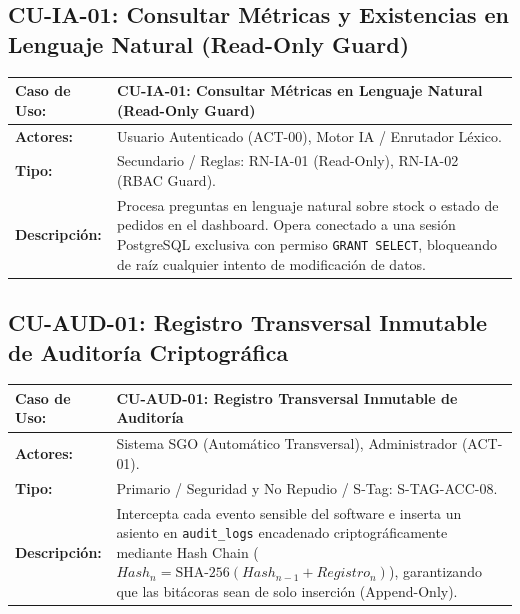\documentclass[12pt,a4paper]{report}
\begin{document}
\subsection{CU-IA-01: Consultar Métricas y Existencias en Lenguaje Natural (Read-Only Guard)}
\begin{table}[H]
\centering
\small
\begin{tabularx}{\textwidth}{|L{3.5cm}|X|}
\hline
{}\color{white}\textbf{Caso de Uso:} & \textbf{CU-IA-01: Consultar Métricas en Lenguaje Natural (Read-Only Guard)} \\
\hline
\textbf{Actores:} & Usuario Autenticado (ACT-00), Motor IA / Enrutador Léxico. \\
\hline
\textbf{Tipo:} & Secundario / Reglas: RN-IA-01 (Read-Only), RN-IA-02 (RBAC Guard). \\
\hline
\textbf{Descripción:} & Procesa preguntas en lenguaje natural sobre stock o estado de pedidos en el dashboard. Opera conectado a una sesión PostgreSQL exclusiva con permiso \texttt{GRANT SELECT}, bloqueando de raíz cualquier intento de modificación de datos. \\
\hline
\end{tabularx}
\end{table}

\subsection{CU-AUD-01: Registro Transversal Inmutable de Auditoría Criptográfica}
\begin{table}[H]
\centering
\small
\begin{tabularx}{\textwidth}{|L{3.5cm}|X|}
\hline
{}\color{white}\textbf{Caso de Uso:} & \textbf{CU-AUD-01: Registro Transversal Inmutable de Auditoría} \\
\hline
\textbf{Actores:} & Sistema SGO (Automático Transversal), Administrador (ACT-01). \\
\hline
\textbf{Tipo:} & Primario / Seguridad y No Repudio / S-Tag: S-TAG-ACC-08. \\
\hline
\textbf{Descripción:} & Intercepta cada evento sensible del software e inserta un asiento en \texttt{audit\_logs} encadenado criptográficamente mediante Hash Chain ($Hash_n = \text{SHA-256}(Hash_{n-1} + Registro_n)$), garantizando que las bitácoras sean de solo inserción (Append-Only). \\
\hline
\end{tabularx}
\end{table}
\end{document}
